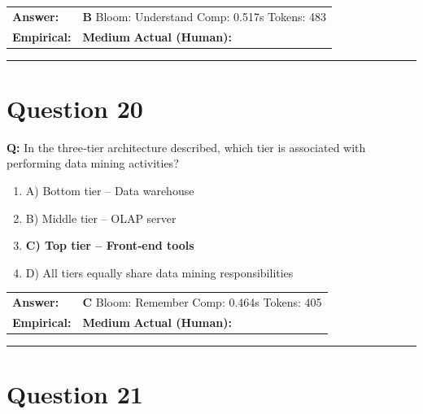 \documentclass[9pt]{article}
\begin{document}
\begin{tabular}{@{}l p{10.5cm}@{}}
\textbf{Answer:} & \textbf{B} \hspace{1em} Bloom: Understand \hspace{1em} Comp: 0.517s \hspace{1em} Tokens: 483 \\
\textbf{Empirical:} & \textbf{Medium} \hspace{1em} \textbf{Actual (Human):} \underline{\hspace{5cm}}
\end{tabular}

\vspace{0.2cm}
\rule{\textwidth}{0.4pt}
\vspace{0.2cm}


\section*{Question 20}

\textbf{Q:} In the three‑tier architecture described, which tier is associated with performing data mining activities?

\begin{enumerate}[label=\textbf{\alph{*})}, nosep]
    \item A) Bottom tier – Data warehouse
    \item B) Middle tier – OLAP server
    \item \textbf{C) Top tier – Front‑end tools} %
    \item D) All tiers equally share data mining responsibilities

\end{enumerate}

\begin{tabular}{@{}l p{10.5cm}@{}}
\textbf{Answer:} & \textbf{C} \hspace{1em} Bloom: Remember \hspace{1em} Comp: 0.464s \hspace{1em} Tokens: 405 \\
\textbf{Empirical:} & \textbf{Medium} \hspace{1em} \textbf{Actual (Human):} \underline{\hspace{5cm}}
\end{tabular}

\vspace{0.2cm}
\rule{\textwidth}{0.4pt}
\vspace{0.2cm}


\section*{Question 21}
\end{document}

